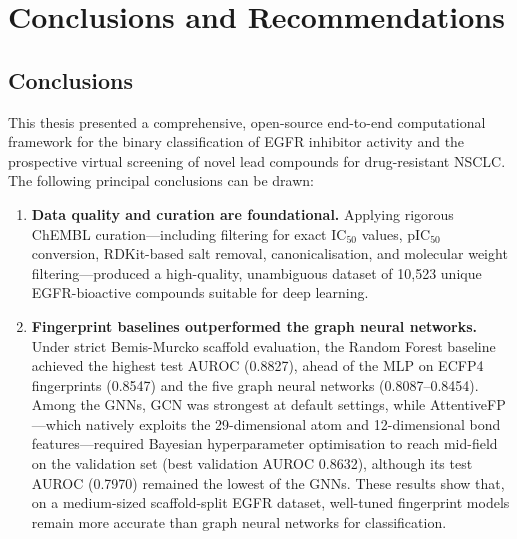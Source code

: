 \chapter{Conclusions and Recommendations}

\section{Conclusions}

This thesis presented a comprehensive, open-source end-to-end computational
framework for the binary classification of EGFR inhibitor activity and the
prospective virtual screening of novel lead compounds for drug-resistant NSCLC.
The following principal conclusions can be drawn:

\begin{enumerate}
    \item \textbf{Data quality and curation are foundational.} Applying rigorous
          ChEMBL curation---including filtering for exact IC$_{50}$ values, pIC$_{50}$
          conversion, RDKit-based salt removal, canonicalisation, and molecular weight
          filtering---produced a high-quality, unambiguous dataset of 10,523 unique
          EGFR-bioactive compounds suitable for deep learning.

    \item \textbf{Fingerprint baselines outperformed the graph neural networks.}
          Under strict Bemis-Murcko scaffold evaluation, the Random Forest baseline
          achieved the highest test AUROC (0.8827), ahead of the MLP on ECFP4
          fingerprints (0.8547) and the five graph neural networks (0.8087--0.8454).
          Among the GNNs, GCN was strongest at default settings, while
          AttentiveFP---which natively exploits the 29-dimensional atom and
          12-dimensional bond features---required Bayesian hyperparameter optimisation
          to reach mid-field on the validation set (best validation AUROC 0.8632),
          although its test AUROC (0.7970) remained the lowest of the GNNs. These
          results show that, on a medium-sized scaffold-split EGFR dataset, well-tuned
          fingerprint models remain more accurate than graph neural networks for
          classification.


\end{enumerate}
